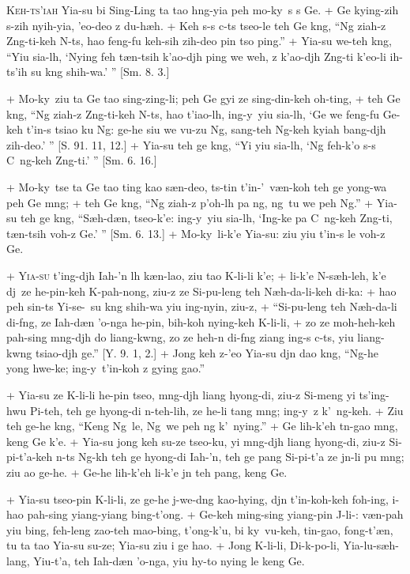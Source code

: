 \header
\lettrine{K}{eh-ts'iah} Yia-su bi Sing-Ling ta tao h\oo ng-yia peh mo-ky\y\ s s Ge.
+	Ge kying-zih s-zih nyih-yia, 'eo-deo z du-h\ae h.
+	Keh s-s c\y-ts tseo-le teh Ge k\oo ng, ``Ng ziah-z Z\oo ng-ti-keh N-ts, hao feng-fu keh-sih zih-deo pin tso ping.''
+	Yia-su we-teh k\oo ng, ``Yiu sia-l\oo h, `Nying feh t\ae n-tsih k'ao-dj\oo h ping we weh, z k'ao-dj\oo h Z\oo ng-ti
	k'eo-li ih-ts'ih su k\oo ng shih-wa.' '' [Sm. 8. 3.]
\par
+	Mo-ky\y\ ziu ta Ge tao sing-zing-li; peh Ge gyi ze sing-din-keh oh-ting,
+	teh Ge k\oo ng, ``Ng ziah-z Z\oo ng-ti-keh N-ts, hao t'iao-l\oo h, ing-y\y{}iu sia-l\oo h, `Ge we feng-fu Ge-keh
	t'in-s tsiao ku Ng: ge-he siu we vu-zu Ng, sang-teh Ng-keh kyiah bang-dj\oo h zih-deo.' '' [S. 91. 11, 12.]
+	Yia-su teh ge k\oo ng, ``Yi yiu sia-l\oo h, `Ng feh-k'o s-s C\y\ ng-keh Z\oo ng-ti.' '' [Sm. 6. 16.]
\par
+	Mo-ky\y\ tse ta Ge tao ting kao s\ae n-deo, ts-tin t'in-'\oo\ v\ae n-koh teh ge y\y ong-wa peh Ge m\oo ng;
+	teh Ge k\oo ng, ``Ng ziah-z p'oh-l\oo h pa ng\oo, ng\oo\ tu we peh Ng.''
+	Yia-su teh ge k\oo ng, ``S\ae h-d\ae n, tseo-k'e: ing-y\y{}iu sia-l\oo h, `Ing-ke pa C\y\ ng-keh Z\oo ng-ti, t\ae n-tsih
	voh-z Ge.' '' [Sm. 6. 13.]
+	Mo-ky\y\ li-k'e Yia-su: ziu yiu t'in-s le voh-z Ge.
\par
+	\textsc{Yia-su} t'ing-dj\oo h Iah-'\e n l\oo h k\ae n-lao, ziu tao K\oo-li-li k'e;
+	li-k'e N\oo-s\ae h-leh, k'e dj\y\ ze he-pin-keh K\oo-pah-nong, ziu-z ze Si-pu-leng teh N\ae h-da-li-keh di-ka:
+	hao peh sin-ts Yi-se-\oo\ su k\oo ng shih-wa yiu ing-nyin, ziu-z,
+	``Si-pu-leng teh N\ae h-da-li di-f\oo ng, ze Iah-d\ae n 'o-nga he-pin, bih-koh nying-keh K\oo-li-li,
+	zo ze moh-heh-keh pah-sing m\oo ng-dj\oo h do liang-kw\oo ng, zo ze heh-\e n di-f\oo ng ziang ing-s c\y-ts, yiu
	liang-kw\oo ng tsiao-dj\oo h ge.'' [Y. 9. 1, 2.]
+	Jong keh z-'eo Yia-su dj\y n dao k\oo ng, ``Ng-he y\y ong hwe-ke; ing-y\y\ t'in-koh z gying gao.''
\par
+	Yia-su ze K\oo-li-li he-pin tseo, m\oo ng-dj\oo h liang hy\y ong-di, ziu-z Si-meng yi ts'ing-hwu Pi-teh, teh ge
	hy\y ong-di \E n-teh-lih, ze he-li tang m\oo ng; ing-y\y\ z k'\oo\ ng-keh.
+	Ziu teh ge-he k\oo ng, ``Keng Ng\oo\ le, Ng\oo\ we peh ng k'\oo\ nying.''
+	Ge lih-k'eh t\e n-gao m\oo ng, keng Ge k'e.
+	Yia-su jong keh su-ze tseo-ku, yi m\oo ng-dj\oo h liang hy\y ong-di, ziu-z Si-pi-t'a-keh n-ts Ng\oo-k\oo h teh ge
	hy\y ong-di Iah-'\e n, teh ge pang Si-pi-t'a ze j\y n-li pu m\oo ng; ziu ao ge-he.
+	Ge-he lih-k'eh li-k'e j\y n teh pang, keng Ge.
\par
+	Yia-su tseo-pin K\oo-li-li, ze ge-he j\y-we-d\oo ng kao-hy\y ing, dj\y n t'in-koh-keh foh-ing, i-hao pah-sing
	yiang-yiang bing-t'ong.
+	Ge-keh ming-sing yiang-pin J\y-li-\oo: v\ae n-pah yiu bing, feh-leng zao-teh mao-bing, t'ong-k'u, bi ky\y\ vu-keh,
	tin-gao, fong-t'\ae n, tu ta tao Yia-su su-ze; Yia-su ziu i ge hao.
+	Jong K\oo-li-li, Di-k\oo-po-li, Yia-lu-s\ae h-lang, Yiu-t'a, teh Iah-d\ae n 'o-nga, yiu hy\y-to nying le keng Ge.



